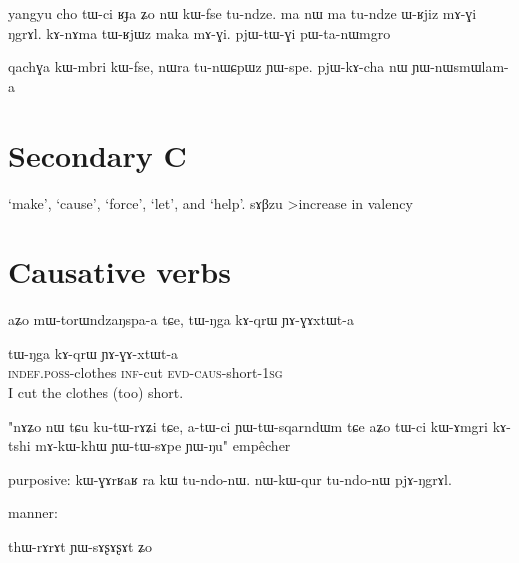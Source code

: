 \documentclass[oldfontcommands,oneside,a4paper,11pt]{article}
\newcommand{\ipa}[1]{{\phon #1}} %
\begin{document}
yangyu cho tɯ-ci ʁɟa ʑo nɯ kɯ-fse tu-ndze.
ma nɯ ma tu-ndze ɯ-ʁjiz mɤ-ɣi ŋgrɤl.
kɤ-nɤma tɯ-ʁjɯz maka mɤ-ɣi.
pjɯ-tɯ-ɣi pɯ-ta-nɯmgro

qachɣa kɯ-mbri kɯ-fse, nɯra tu-nɯɕpɯz ɲɯ-spe. 
pjɯ-kɤ-cha nɯ ɲɯ-nɯsmɯlam-a
  \section{Secondary C} 
‘make’, ‘cause’, ‘force’, ‘let’, and ‘help’.
sɤβzu
>increase in valency
\section{Causative verbs}
aʑo mɯ-torɯndzaŋspa-a tɕe, tɯ-ŋga kɤ-qrɯ ɲɤ-ɣɤxtɯt-a



 \begin{exe}
\ex \label{ex:GAxtWt}
\gll
\ipa{tɯ-ŋga}  	\ipa{kɤ-qrɯ}  	\ipa{ɲɤ-ɣɤ-xtɯt-a}  \\
\textsc{indef.poss}-clothes \textsc{inf}-cut \textsc{evd-caus}-short-\textsc{1sg}\\
 \glt I cut the clothes (too) short.
\end{exe}



"nɤʑo nɯ tɕu ku-tɯ-rɤʑi tɕe, a-tɯ-ci ɲɯ-tɯ-sqarndɯm tɕe aʑo
tɯ-ci kɯ-ɤmgri kɤ-tshi mɤ-kɯ-khɯ ɲɯ-tɯ-sɤpe ɲɯ-ŋu"
empêcher

purposive:
kɯ-ɣɤrʁaʁ ra kɯ tu-ndo-nɯ.
nɯ-kɯ-qur tu-ndo-nɯ pjɤ-ŋgrɤl.

  
 
manner:

thɯ-rɤrɤt ɲɯ-sɤʂɤʂɤt ʑo



\end{document}
